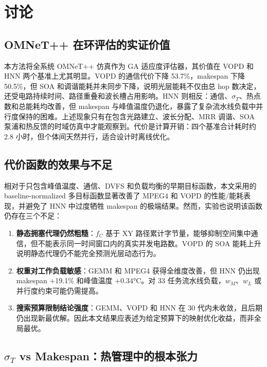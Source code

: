 \documentclass[conference]{IEEEtran}
\begin{document}
\section{讨论}

\subsection{OMNeT++ 在环评估的实证价值}

本方法将全系统 OMNeT++ 仿真作为 GA 适应度评估器，其价值在 VOPD 和 HNN 两个基准上尤其明显。VOPD 的通信代价下降 53.7\%，makespan 下降 50.5\%，但 SOA 和调谐能耗并未同步下降，说明光层能耗不仅由总 hop 数决定，还受电路持续时间、路径重叠和波长槽占用影响。HNN 则相反：通信、$\sigma_T$、热点数和总能耗均改善，但 makespan 与峰值温度仍退化，暴露了复杂流水线负载中并行度保持的困难。上述现象只有在包含光路建立、波长分配、MRR 调谐、SOA 泵浦和热反馈的时域仿真中才能观察到。代价是计算开销：四个基准合计耗时约 2.8 小时，但个体间天然并行，适合设计时离线优化。

\subsection{代价函数的效果与不足}

相对于只包含峰值温度、通信、DVFS 和负载均衡的早期目标函数，本文采用的 baseline-normalized 多目标函数显著改善了 MPEG4 和 VOPD 的性能/能耗表现，并避免了 HNN 中过度牺牲 makespan 的极端结果。然而，实验也说明该函数仍存在三个不足：

\begin{enumerate}
\item \textbf{静态拥塞代理仍然粗糙}：$f_C$ 基于 XY 路径累计字节量，能够抑制空间集中通信，但不能表示同一时间窗口内的真实并发电路数。VOPD 的 SOA 能耗上升说明静态代理仍不能完全预测光层动态行为。
\item \textbf{权重对工作负载敏感}：GEMM 和 MPEG4 获得全维度改善，但 HNN 仍出现 makespan +19.1\% 和峰值温度 +0.34\si{\degreeCelsius}。对 33 任务流水线负载，$w_M$、$w_L$ 或并行度约束可能仍需提高。
\item \textbf{搜索预算限制结论强度}：GEMM、VOPD 和 HNN 在 30 代内未收敛，且后期仍出现新最优解。因此本文结果应表述为给定预算下的映射优化收益，而非全局最优。
\end{enumerate}

\subsection{$\sigma_T$ vs Makespan：热管理中的根本张力}
\end{document}
